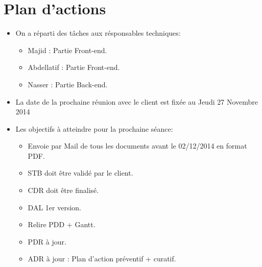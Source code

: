 \documentclass{../../../../../res/rapport}
\begin{document}
    \section{Plan d'actions} 
    \label{sec:plan_d_actions}
                \begin{itemize}
                  \item On a réparti des tâches aux résponsables techniques:
                  		\begin{itemize}
                  			\item Majid : Partie Front-end.
                  			\item Abdellatif : Partie Front-end.
                  			\item Nasser : Partie Back-end.\\

                  		\end{itemize}
                  \item La date de la prochaine réunion avec le client est fixée au Jeudi 27 Novembre 2014
                  \item Les objectifs à atteindre pour la prochaine séance:
                  		\begin{itemize}
                  		  	\item Envoie par Mail de tous les documents avant le 02/12/2014 en format PDF.
                  		  	\item STB doit être validé par le client. 
                  		  	\item CDR doit être finalisé. 
                  		  	\item DAL 1er version.
                  		  	\item Relire PDD + Gantt.
                  		  	\item PDR à jour.
                  		  	\item ADR à jour : Plan d'action préventif + curatif.
                  		\end{itemize}  
                \end{itemize}
\end{document}
